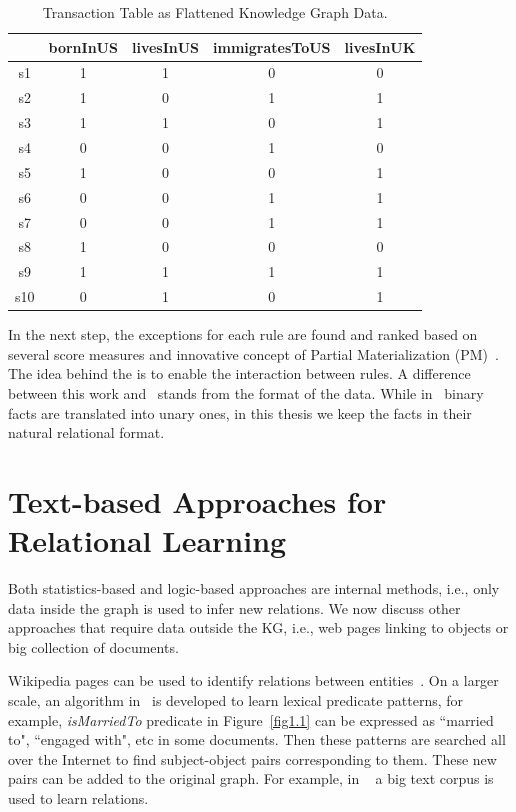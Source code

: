 \begin{table}
\begin{center}
\begin{tabular}{|c|c|c|c|c|}
\hline
 & bornInUS & livesInUS & immigratesToUS & livesInUK\\
\hline\hline
s1 & 1 & 1 & 0 & 0\\
\hline
s2 & 1 & 0 & 1 & 1\\
\hline
s3 & 1 & 1 & 0 & 1\\
\hline
s4 & 0 & 0 & 1 & 0\\
\hline
s5 & 1 & 0 & 0 & 1\\
\hline
s6 & 0 & 0 & 1 & 1\\
\hline
s7 & 0 & 0 & 1 & 1\\
\hline
s8 & 1 & 0 & 0 & 0\\
\hline
s9 & 1 & 1 & 1 & 1\\
\hline
s10 & 0 & 1 & 0 & 1\\
\hline
\end{tabular}
\end{center}
\caption{Transaction Table as Flattened Knowledge Graph Data.}
\label{table2}
\end{table}

In the next step, the exceptions for each rule are found and ranked based on several score measures and innovative concept of Partial Materialization (PM)~\cite{ref12}. The idea behind the is to enable the interaction between rules. A difference between this work and~\cite{ref12} stands from the format of the data. While in~\cite{ref12} binary facts are translated into unary ones, in this thesis we keep the facts in their natural relational format.

\section{Text-based Approaches for Relational Learning}

Both statistics-based and logic-based approaches are internal methods, i.e., only data inside the graph is used to infer new relations. We now discuss other approaches that require data outside the KG, i.e., web pages linking to objects or big collection of documents.

Wikipedia pages can be used to identify relations between entities~\cite{ref18}. On a larger scale, an algorithm in~\cite{ref19} is developed to learn lexical predicate patterns, for example, \textit{isMarriedTo} predicate in Figure~\ref{fig1.1} can be expressed  as ``married to", ``engaged with", etc in some documents. Then these patterns are searched all over the Internet to find subject-object pairs corresponding to them. These new pairs can be added to the original graph. For example, in ~\cite{ref19} a  big text corpus is used to learn relations.

